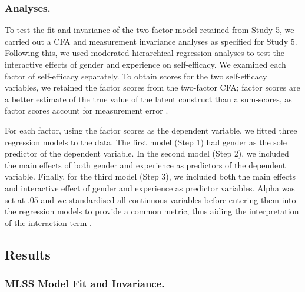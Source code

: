 \documentclass[
  12pt,
  a4paper,
]{book}
\begin{document}
\hypertarget{study-6-analyses}{%
\subsubsection{Analyses.}\label{study-6-analyses}}

To test the fit and invariance of the two-factor model retained from Study 5, we carried out a CFA and measurement invariance analyses as specified for Study 5. Following this, we used moderated hierarchical regression analyses to test the interactive effects of gender and experience on self-efficacy. We examined each factor of self-efficacy separately. To obtain scores for the two self-efficacy variables, we retained the factor scores from the two-factor CFA; factor scores are a better estimate of the true value of the latent construct than a sum-scores, as factor scores account for measurement error \citep[cf.~][]{Grice2001}.

For each factor, using the factor scores as the dependent variable, we fitted three regression models to the data. The first model (Step 1) had gender as the sole predictor of the dependent variable. In the second model (Step 2), we included the main effects of both gender and experience as predictors of the dependent variable. Finally, for the third model (Step 3), we included both the main effects and interactive effect of gender and experience as predictor variables. Alpha was set at .05 and we standardised all continuous variables before entering them into the regression models to provide a common metric, thus aiding the interpretation of the interaction term \citep{Aiken1991}.

\hypertarget{study-6-results}{%
\subsection{Results}\label{study-6-results}}

\hypertarget{mlss-model-fit-and-invariance.}{%
\subsubsection{MLSS Model Fit and Invariance.}\label{mlss-model-fit-and-invariance.}}
\end{document}
